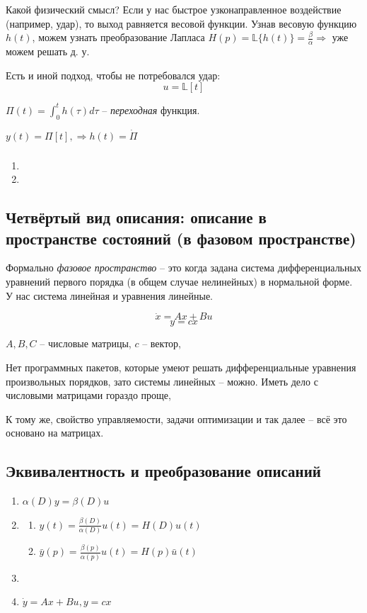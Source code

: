 \documentclass[main.tex]{subfiles}
\begin{document}
Какой физический смысл?
Если у нас быстрое узконаправленное воздействие (например, удар), то выход равняется весовой функции.
Узнав весовую функцию $ h(t) $, можем узнать преобразование Лапласа $ H(p) = \mathds{L}\{h(t)\} = \frac{\beta}{\alpha} \Rightarrow $ уже можем решать д. у.

Есть и иной подход, чтобы не потребовался удар:
$$ u = \mathds{L}[t]  $$ %

$\Pi(t) = \int_0^t h(\tau)d\tau$ -- \emph{переходная} функция.

$ y(t) = \Pi[t],  \Rightarrow h(t) = \dot \Pi $

\subsubsection{}

\begin{enumerate}[noitemsep]
	\item
	\item
\end{enumerate}

\subsection{Четвёртый вид описания: описание в пространстве состояний (в фазовом пространстве)}

Формально \emph{фазовое пространство} -- это когда задана система дифференциальных уравнений первого порядка (в общем случае нелинейных) в нормальной форме.
У нас система линейная и уравнения линейные.

$$ \dot x = Ax + Bu $$
$$ y = cx $$

$ A, B, C $ -- числовые матрицы, $ c $ -- вектор,

Нет программных пакетов, которые умеют решать дифференциальные уравнения произвольных порядков, зато системы линейных -- можно.
Иметь дело с числовыми матрицами гораздо проще,

К тому же, свойство управляемости, задачи оптимизации и так далее -- всё это основано на матрицах.

\subsection{Эквивалентность и преобразование описаний}

\begin{enumerate}[noitemsep]
	\item $ \alpha(D)y = \beta(D)u $ \label{represent:1}
	\item  \label{represent:2}
	\begin{enumerate}[noitemsep]
		\item $ y(t) = \frac{\beta(D)}{\alpha(D)}u(t) = H(D)u(t) $
		\item $ \bar y(p) = \frac{\beta(p)}{\alpha(p)}u(t) = H(p) \bar u(t) $
	\end{enumerate}
	\item \label{represent:3} %
	\item $ \dot y = Ax + Bu, y = cx $ \label{represent:4} %
\end{enumerate}
\end{document}
